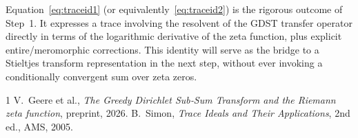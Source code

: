 \documentclass[11pt,a4paper]{article}
\begin{document}
Equation~\eqref{eq:traceid1} (or equivalently~\eqref{eq:traceid2}) is the rigorous outcome of Step~1.  It expresses a trace involving the resolvent of the GDST transfer operator directly in terms of the logarithmic derivative of the zeta function, plus explicit entire/meromorphic corrections.  This identity will serve as the bridge to a Stieltjes transform representation in the next step, without ever invoking a conditionally convergent sum over zeta zeros.

\begin{thebibliography}{1}
 V.~Geere et al., \emph{The Greedy Dirichlet Sub‑Sum Transform and the Riemann zeta function}, preprint, 2026.
 B.~Simon, \emph{Trace Ideals and Their Applications}, 2nd ed., AMS, 2005.
\end{thebibliography}
\end{document}

